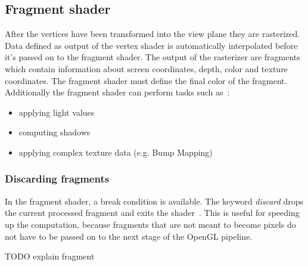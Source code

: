 \subsection{Fragment shader}	
After the vertices have been transformed into the view plane they are rasterized. Data defined as output of the vertex shader is automatically interpolated before it's passed on to the fragment shader. The output of the rasterizer are fragments which contain information about screen coordinates, depth, color and texture coordinates. The fragment shader must define the final color of the fragment.\\
Additionally the fragment shader can perform tasks such as~\cite{book:computerGraphicsHill}: %
\begin{itemize}
	\item applying light values
	\item computing shadows
	\item applying complex texture data (e.g. Bump Mapping)
\end{itemize}

\subsubsection{Discarding fragments}
In the fragment shader, a break condition is available. The keyword \emph{discard} drops the current processed fragment and exits the shader~\cite{misc:glslTut}. This is useful for speeding up the computation, because fragments that are not meant to become pixels do not have to be passed on to the next stage of the OpenGL pipeline.

TODO explain fragment




